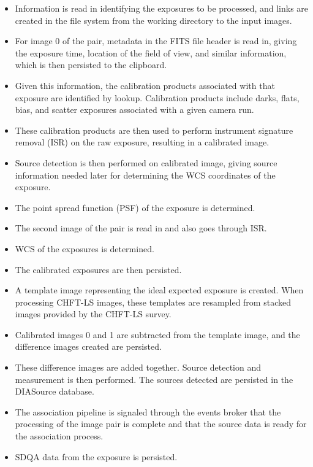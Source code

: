 \begin{itemize}

\item Information is read in identifying the exposures to be processed, and 
links are created in the file system from the working directory to the input
images.

\item For image 0 of the pair, metadata in the FITS file header is read in, 
giving the exposure time, location of the field of view, and similar information, 
which is then persisted to the clipboard.

\item Given this information, the calibration products associated with that
exposure are identified by lookup. Calibration products include darks,
flats, bias, and scatter exposures associated with a given camera run.

\item These calibration products are then used to perform instrument
signature removal (ISR) on the raw exposure, resulting in a calibrated image.

\item Source detection is then performed on calibrated image, giving source
information needed later for determining the WCS coordinates of the
exposure.

\item The point spread function (PSF) of the exposure is determined.

\item The second image of the pair is read in and also goes through ISR.

\item WCS of the exposures is determined.

\item The calibrated exposures are then persisted.

\item A template image representing the ideal expected exposure is
created. When processing CHFT-LS images, these templates are 
resampled from stacked images provided by the CHFT-LS survey.

\item Calibrated images 0 and 1 are subtracted from the template
image, and the difference images created are persisted.

\item These difference images are added together. Source detection
and measurement is then performed. The sources detected are
persisted in the DIASource database.

\item The association pipeline is signaled through the events broker
that the processing of the image pair is complete and that the source
data is ready for the association process.

\item SDQA data from the exposure is persisted.

\end{itemize}

